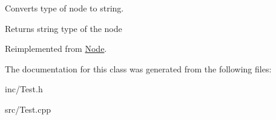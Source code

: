 Converts type of node to string. 

\begin{DoxyReturn}{Returns}
string type of the node 
\end{DoxyReturn}


Reimplemented from \hyperlink{classNode_abce0a9ddac6a5e2c0e546dbe6af02e3d}{Node}.



The documentation for this class was generated from the following files\+:\begin{DoxyCompactItemize}
\item 
inc/Test.\+h\item 
src/Test.\+cpp\end{DoxyCompactItemize}
